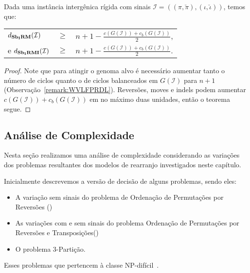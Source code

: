 \begin{theorem}\label{theorem:OCNPWYNL}
Dada uma instância intergênica rígida com sinais $\mathcal{I}=((\pi,\breve\pi),(\iota,\breve\iota))$, temos que:

\begin{tabular}{lll}
  $d_{\textbf{Sb\textsubscript{I}RM}}(\mathcal{I})$     & $ \ge $ & ${n + 1} - \frac{c(G(\mathcal{I})) + c_b(G(\mathcal{I}))}{2}$, \\
  e $d_{\textbf{Sb\textsubscript{I}RMI}}(\mathcal{I})$    & $ \ge $ & ${n + 1} - \frac{c(G(\mathcal{I})) + c_b(G(\mathcal{I}))}{2}$. \\
\end{tabular}
\end{theorem}
\begin{proof}
Note que para atingir o genoma alvo é necessário aumentar tanto o número de ciclos quanto o de ciclos balanceados em $G(\mathcal{I})$ para $n+1$ (Observação~\ref{remark:WVLFPRDL}). Reversões, moves e indels podem aumentar $c(G(\mathcal{I})) + c_b(G(\mathcal{I}))$ em no máximo duas unidades, então o teorema segue.
\end{proof}

\subsection{Análise de Complexidade}

Nesta seção realizamos uma análise de complexidade considerando as variações dos problemas resultantes dos modelos de rearranjo investigados neste capítulo.

Inicialmente descrevemos a versão de decisão de alguns problemas, sendo eles:
\begin{itemize}
  \item A variação sem sinais do problema de Ordenação de Permutações por Reversões (\SbR)
  \item As variações com e sem sinais do problema Ordenação de Permutações por Reversões e Transposições(\SbRT)
  \item O problema $3$-Partição.
\end{itemize}
Esses problemas que pertencem à classe NP-difícil~\cite{1999-caprara,2019b-oliveira-etal,1990-garey-johnson}.

\begin{decision}
\end{decision}

